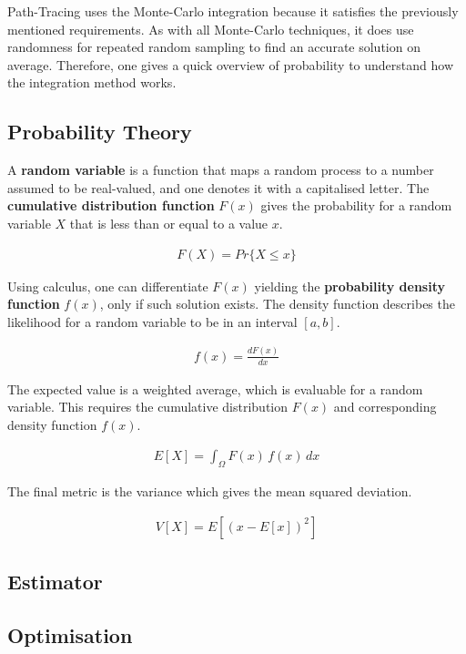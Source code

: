 Path-Tracing uses the Monte-Carlo integration because it satisfies the previously mentioned requirements. 
As with all Monte-Carlo techniques, it does use randomness for repeated random sampling to find an accurate solution on average.
Therefore, one gives a quick overview of probability to understand how the integration method works.

\subsection{Probability Theory}

A \textbf{random variable} is a function that maps a random process to a number assumed to be real-valued, and one denotes it with a capitalised letter.
The \textbf{cumulative distribution function} $F(x)$ gives the probability for a random variable $X$ that is less than or equal to a value $x$.

\begin{align*}
F(X)=Pr\{X\le x\}
\end{align*}

Using calculus, one can differentiate $F(x)$ yielding the \textbf{probability density function} $f(x)$, only if such solution exists.
The density function describes the likelihood for a random variable to be in an interval $[a,b]$.

\begin{align*}
f(x)=\frac{dF(x)}{dx}
\end{align*}

The expected value is a weighted average, which is evaluable for a random variable.
This requires the cumulative distribution $F(x)$ and corresponding density function $f(x)$.

\begin{align*}
E[X]=\int_{\Omega}F(x)\,f(x)\,dx
\end{align*}

The final metric is the variance which gives the mean squared deviation.

\begin{align*}
V[X]=E\left[(x-E[x])^2\right]
\end{align*}

\subsection{Estimator}

\subsection{Optimisation}


\cite{veach_robust_nodate}
